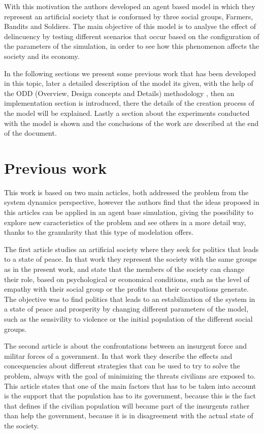 \documentclass{wscpaperproc}
\begin{document}
With this motivation the authors developed an agent based model in which they
represent an artificial society that is conformed by three social groups,
Farmers, Bandits and Soldiers. The main objective of this model is to
analyse the effect of delincuency by testing different scenarios that
occur based on the configuration of the parameters of the simulation,
in order to see how this phenomenon affects the society and its
economy.

In the following sections we present some previous work that has been developed
in this topic, later a detailed description of the model its given, with the
help of the ODD (Overview, Design concepts and Details) methodology \cite{odd},
then an implementation section is introduced, there the details of the creation
process of the model will be explained. Lastly a section about the experiments
conducted with the model is shown and the conclusions of the work are described
at the end of the document.

\section{Previous work}

This work is based on two main acticles, both addressed the problem from the
system dynamics perspective, however the authors find that the ideas proposed in
this articles can be applied in an agent base simulation, giving the possibility
to explore new caracteristics of the problem and see others in a more
detail way, thanks to the granularity that this type of modelation offers.

The first article studies an artificial society where they seek for politics
that leads to a state of peace. In that work they represent the society with
the same groups as in the present work, and state that the members of the
society can change their role, based on psychological or economical conditions,
such as the level of empathy with their social group or the profits
that their occupations generate. The objective was to find politics
that leads to an estabilization of the system in a state of peace and
prosperity by changing different parameters of the model, such as the
sensivility to violence or the initial population of the different social
groups. \cite{article1}

The second article is about the confrontations between an insurgent force and
militar forces of a government. In that work they describe the effects and
concequencies about different strategies that can be used to try to solve the
problem, always with the goal of minimizing the threats civilians are exposed to.
This article states that one of the main factors that has to be taken
into account is the support that the population has to its government, because
this is the fact that defines if the civilian population will became part of the
insurgents rather than help the government, because it is in disagreement with
the actual state of the society. \cite{article2}
\end{document}
